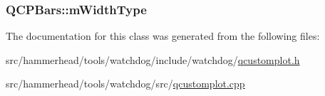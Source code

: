 \subsubsection[{\texorpdfstring{m\+Width\+Type}{mWidthType}}]{ Q\+C\+P\+Bars\+::m\+Width\+Type\hspace{0.3cm}{\ttfamily [protected]}}\hypertarget{classQCPBars_a94dba1309496c7601d01e2c59715cbb3}{}\label{classQCPBars_a94dba1309496c7601d01e2c59715cbb3}


The documentation for this class was generated from the following files\+:\begin{DoxyCompactItemize}
\item 
src/hammerhead/tools/watchdog/include/watchdog/\hyperlink{qcustomplot_8h}{qcustomplot.\+h}\item 
src/hammerhead/tools/watchdog/src/\hyperlink{qcustomplot_8cpp}{qcustomplot.\+cpp}\end{DoxyCompactItemize}
